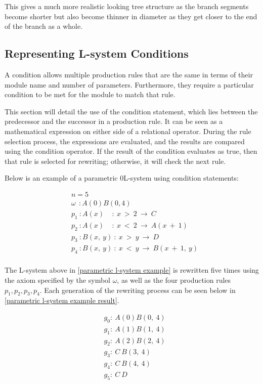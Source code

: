 \noindent
This gives a much more realistic looking tree structure as the branch segments become shorter but also become thinner in diameter as they get closer to the end of the branch as a whole. 


\subsection{Representing L-system Conditions} \label{Condition L-system Subsection}

A condition allows multiple production rules that are the same in terms of their module name and number of parameters. Furthermore, they require a particular condition to be met for the module to match that rule. 

This section will detail the use of the condition statement, which lies between the predecessor and the successor in a production rule. It can be seen as a mathematical expression on either side of a relational operator. During the rule selection process, the expressions are evaluated, and the results are compared using the condition operator. If the result of the condition evaluates as true, then that rule is selected for rewriting; otherwise, it will check the next rule. 


Below is an example of a parametric 0L-system using condition statements:

\begin{equation} \label{parametric l-system example}
\begin{aligned}
	&n=5 \\
	&\omega~~ : A(0)B(0,4)\\
	&p_1~ :  A(x)~~~~~ :~ x~ >~ 2~ \rightarrow~ C\\
	&p_2~ :  A(x)~~~~~ :~ x~ <~ 2~ \rightarrow~ A(x~ +~ 1)\\
	&p_3~ :  B(x,~ y)~ :~ x~ >~ y~ \rightarrow~ D\\
	&p_4~ :  B(x,~ y)~ :~ x~ <~ y~ \rightarrow~ B(x~ +~ 1,~ y)\\
\end{aligned}
\end{equation}

\noindent
The L-system above in \ref{parametric l-system example} is rewritten five times using the axiom specified by the symbol $\omega$, as well as the four production rules $p_1, p_2, p_3, p_4$. Each generation of the rewriting process can be seen below in \ref{parametric l-system example result}.

\begin{equation} \label{parametric l-system example result}
\begin{aligned}
	&g_0 :~ A(0)B(0,~4)\\
	&g_1 :~ A(1)B(1,~4)\\
	&g_2 :~ A(2)B(2,~4)\\
	&g_3 :~ C~B(3,~4)\\
	&g_4 :~ C~B(4,~4)\\
	&g_5 :~ C~D\\
\end{aligned}
\end{equation}


